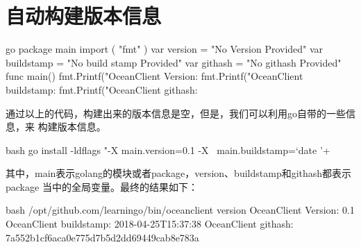 \section{自动构建版本信息}
\begin{code-block}{go}
package main
import (
    "fmt"
)
var version = "No Version Provided"
var buildstamp = "No build stamp Provided"
var githash = "No githash Provided"
func main() {
    fmt.Printf("OceanClient Version: %
    fmt.Printf("OceanClient buildstamp: %
    fmt.Printf("OceanClient githash: %
}
\end{code-block}

通过以上的代码，构建出来的版本信息是空，但是，我们可以利用go自带的一些信息，来
构建版本信息。
\begin{code-block}{bash}
go install -ldflags "-X main.version=0.1 -X \
    main.buildstamp=`date '+%
\end{code-block}
其中，main表示golang的模块或者package，version、buildstamp和githash都表示package
当中的全局变量。最终的结果如下：
\begin{code-block}{bash}
/opt/github.com/learningo/bin/oceanclient version
OceanClient Version: 0.1
OceanClient buildstamp: 2018-04-25T15:37:38
OceanClient githash: 7a552b1cf6aca0e775d7b5d2dd69449cab8e783a
\end{code-block}
